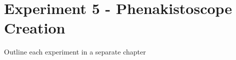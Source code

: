 \chapter*{Experiment 5 - Phenakistoscope Creation}

Outline each experiment in a separate chapter

\citep{kalif-15-a} \citep{kalif-15-b}